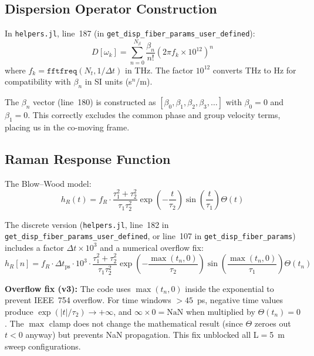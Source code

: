 \documentclass[12pt,a4paper]{article}
\theoremstyle{definition}
\begin{document}
\subsection{Dispersion Operator Construction}

In \texttt{helpers.jl}, line~187 (in \texttt{get\_disp\_fiber\_params\_user\_defined}):
\begin{equation}
D[\omega_k] = \sum_{n=0}^{N_\beta} \frac{\beta_n}{n!}\left(2\pi f_k \times 10^{12}\right)^n
\label{eq:dispersion_discrete}
\end{equation}
where $f_k = \texttt{fftfreq}(N_t, 1/\Delta t)$ in THz. The factor $10^{12}$ converts THz to Hz for compatibility with $\beta_n$ in SI units (s$^n$/m).

\begin{verified}
The $\beta_n$ vector (line~180) is constructed as $[\beta_0, \beta_1, \beta_2, \beta_3, \ldots]$ with $\beta_0 = 0$ and $\beta_1 = 0$. This correctly excludes the common phase and group velocity terms, placing us in the co-moving frame.
\end{verified}

\subsection{Raman Response Function}

The Blow--Wood model:
\begin{equation}
h_R(t) = f_R \cdot \frac{\tau_1^2 + \tau_2^2}{\tau_1\tau_2^2}\exp\!\left(-\frac{t}{\tau_2}\right)\sin\!\left(\frac{t}{\tau_1}\right)\Theta(t)
\label{eq:raman_response}
\end{equation}

The discrete version (\texttt{helpers.jl}, line~182 in \texttt{get\_disp\_fiber\_params\_user\_defined}, or line~107 in \texttt{get\_disp\_fiber\_params}) includes a factor $\Delta t \times 10^3$ and a numerical overflow fix:
\begin{equation}
h_R[n] = f_R \cdot \Delta t_{\text{ps}} \cdot 10^3 \cdot \frac{\tau_1^2 + \tau_2^2}{\tau_1\tau_2^2}\exp\!\left(-\frac{\max(t_n, 0)}{\tau_2}\right)\sin\!\left(\frac{\max(t_n, 0)}{\tau_1}\right)\Theta(t_n)
\label{eq:raman_discrete}
\end{equation}

\begin{advisory}
\textbf{Overflow fix (v3):} The code uses $\max(t_n, 0)$ inside the exponential to prevent IEEE~754 overflow. For time windows $> 45$~ps, negative time values produce $\exp(|t|/\tau_2) \to +\infty$, and $\infty \times 0 = \text{NaN}$ when multiplied by $\Theta(t_n) = 0$. The $\max$ clamp does not change the mathematical result (since $\Theta$ zeroes out $t < 0$ anyway) but prevents NaN propagation. This fix unblocked all L$=$5~m sweep configurations.
\end{advisory}
\end{document}

